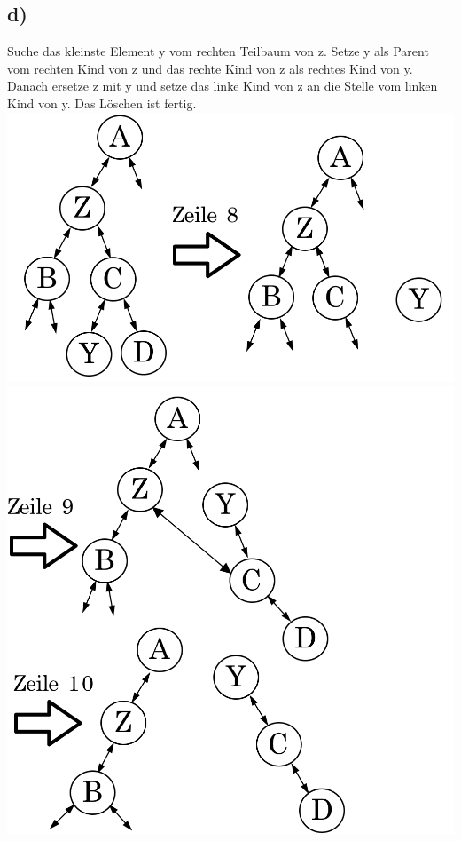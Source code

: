 \documentclass[a4paper,11pt,twoside]{article}
\begin{document}
\subsection*{d)} Suche das kleinste Element y vom rechten Teilbaum von z. Setze y als Parent vom rechten Kind von z und das rechte Kind von z als rechtes Kind von y. Danach ersetze z mit y und setze das linke Kind von z an die Stelle vom linken Kind von y. Das Löschen ist fertig. \\
\includegraphics*[scale=0.2]{Images/D_step_1.png} \\
\includegraphics*[scale=0.2]{Images/D_step_2.png} \\
\end{document}
